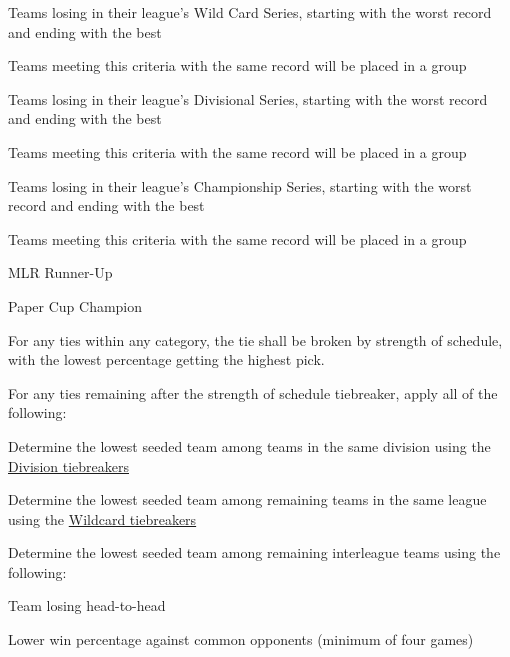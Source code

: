\begin{deepEnumerate}
\begin{deepEnumerate}
\begin{deepEnumerate}
\begin{deepEnumerate}
			\end{deepEnumerate}
			\item Teams losing in their league’s Wild Card Series, starting with the worst record and ending with the best
			\begin{deepEnumerate}
				\item Teams meeting this criteria with the same record will be placed in a group
			\end{deepEnumerate}
			\item Teams losing in their league’s Divisional Series, starting with the worst record and ending with the best
			\begin{deepEnumerate}
				\item Teams meeting this criteria with the same record will be placed in a group
			\end{deepEnumerate}
			\item Teams losing in their league’s Championship Series, starting with the worst record and ending with the best
			\begin{deepEnumerate}
				\item Teams meeting this criteria with the same record will be placed in a group
			\end{deepEnumerate}
			\item MLR Runner-Up
			\item Paper Cup Champion
		\end{deepEnumerate}
		\item For any ties within any category, the tie shall be broken by strength of schedule, with the lowest percentage getting the highest pick.
		\item For any ties remaining after the strength of schedule tiebreaker, apply all of the following:
		\begin{deepEnumerate}
			\item Determine the lowest seeded team among teams in the same division using the \hyperref[sec:Division tiebreakers]{Division tiebreakers}
			\item Determine the lowest seeded team among remaining teams in the same league using the \hyperref[sec:Wildcard tiebreakers]{Wildcard tiebreakers}
			\item Determine the lowest seeded team among remaining interleague teams using the following:
			\begin{deepEnumerate}
				\item Team losing head-to-head
				\item Lower win percentage against common opponents (minimum of four games)

\end{deepEnumerate}
\end{deepEnumerate}
\end{deepEnumerate}
\end{deepEnumerate}
